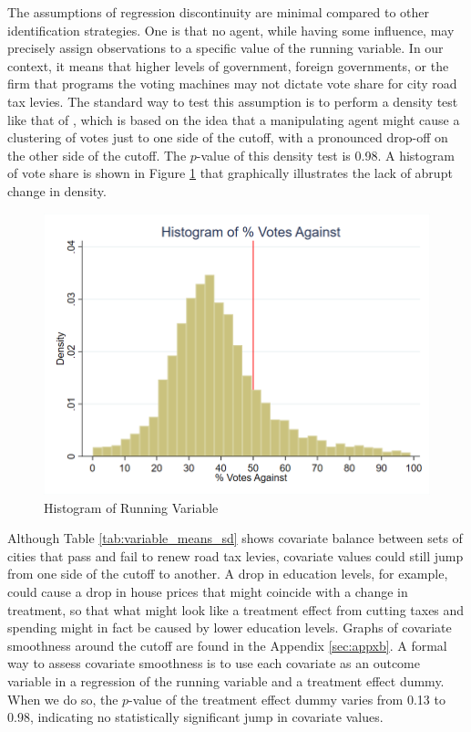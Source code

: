The assumptions of regression discontinuity are minimal compared to other identification strategies.  One is that no agent, while having some influence, may precisely assign observations to a specific value of the running variable.  In our context, it means that higher levels of government, foreign governments, or the firm that programs the voting machines may not dictate vote share for city road tax levies.  The standard way to test this assumption is to perform a density test like that of \cite{cattaneo2020simple}, which is based on the idea that a manipulating agent might cause a clustering of votes just to one side of the cutoff, with a pronounced drop-off on the other side of the cutoff.  The $p$-value of this density test is 0.98. A histogram of vote share is shown in Figure \ref{fig:running_var_hist} that graphically illustrates the lack of abrupt change in density.  

\begin{figure}[ht]
    \centering
    \includegraphics[width=\textwidth,keepaspectratio]{images/votes_pct_against_histogram.png}
    \caption{Histogram of Running Variable}
    \label{fig:running_var_hist}
\end{figure}

Although Table \ref{tab:variable_means_sd} shows covariate balance between sets of cities that pass and fail to renew road tax levies, covariate values could still jump from one side of the cutoff to another. A drop in education levels, for example, could cause a drop in house prices that might coincide with a change in treatment, so that what might look like a treatment effect from cutting taxes and spending might in fact be caused by lower education levels.  Graphs of covariate smoothness around the cutoff are found in the Appendix \ref{sec:appxb}. A formal way to assess covariate smoothness is to use each covariate as an outcome variable in a regression of the running variable and a treatment effect dummy. When we do so, the $p$-value of the treatment effect dummy varies from 0.13 to 0.98, indicating no statistically significant jump in covariate values. 
